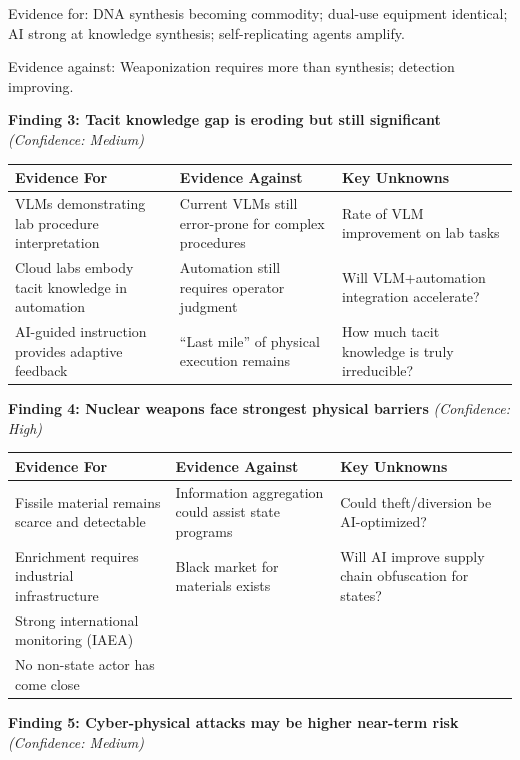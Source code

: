 \documentclass[11pt,letterpaper]{article}
\begin{document}
Evidence for: DNA synthesis becoming commodity; dual-use equipment identical; AI strong at knowledge synthesis; self-replicating agents amplify.

Evidence against: Weaponization requires more than synthesis; detection improving.

\textbf{Finding 3: Tacit knowledge gap is eroding but still significant} \textit{(Confidence: Medium)}

\begin{center}
\small
\begin{tabular}{L{4cm}L{4cm}L{4cm}}
\toprule
\textbf{Evidence For} & \textbf{Evidence Against} & \textbf{Key Unknowns} \\
\midrule
VLMs demonstrating lab procedure interpretation & Current VLMs still error-prone for complex procedures & Rate of VLM improvement on lab tasks \\
Cloud labs embody tacit knowledge in automation & Automation still requires operator judgment & Will VLM+automation integration accelerate? \\
AI-guided instruction provides adaptive feedback & ``Last mile'' of physical execution remains & How much tacit knowledge is truly irreducible? \\
\bottomrule
\end{tabular}
\end{center}

\textbf{Finding 4: Nuclear weapons face strongest physical barriers} \textit{(Confidence: High)}

\begin{center}
\small
\begin{tabular}{L{4cm}L{4cm}L{4cm}}
\toprule
\textbf{Evidence For} & \textbf{Evidence Against} & \textbf{Key Unknowns} \\
\midrule
Fissile material remains scarce and detectable & Information aggregation could assist state programs & Could theft/diversion be AI-optimized? \\
Enrichment requires industrial infrastructure & Black market for materials exists & Will AI improve supply chain obfuscation for states? \\
Strong international monitoring (IAEA) & & \\
No non-state actor has come close & & \\
\bottomrule
\end{tabular}
\end{center}

\textbf{Finding 5: Cyber-physical attacks may be higher near-term risk} \textit{(Confidence: Medium)}
\end{document}

